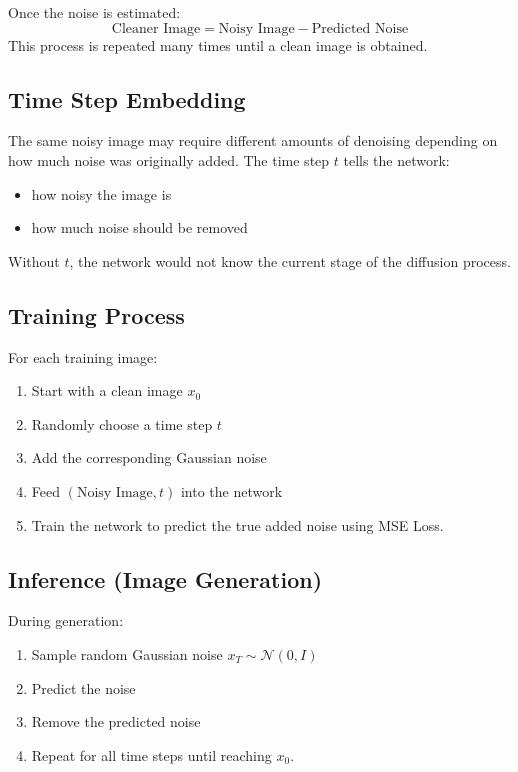 Once the noise is estimated:
\[
\text{Cleaner Image} = \text{Noisy Image} - \text{Predicted Noise}
\]
This process is repeated many times until a clean image is obtained.

\subsection*{Time Step Embedding}

The same noisy image may require different amounts of denoising depending on how much noise was originally added.
The time step $t$ tells the network:
\begin{itemize}
    \item how noisy the image is
    \item how much noise should be removed
\end{itemize}
Without $t$, the network would not know the current stage of the diffusion process.

\subsection*{Training Process}

For each training image:
\begin{enumerate}
    \item Start with a clean image $x_0$
    \item Randomly choose a time step $t$
    \item Add the corresponding Gaussian noise
    \item Feed $(\text{Noisy Image}, t)$ into the network
    \item Train the network to predict the true added noise using MSE Loss.
\end{enumerate}

\subsection*{Inference (Image Generation)}

During generation:
\begin{enumerate}
    \item Sample random Gaussian noise $x_T \sim \mathcal{N}(0, I)$
    \item Predict the noise
    \item Remove the predicted noise
    \item Repeat for all time steps until reaching $x_0$.
\end{enumerate}

